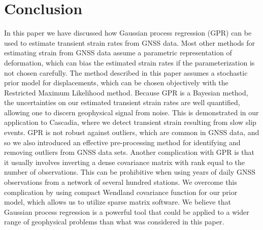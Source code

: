 \documentclass[10pt,letter]{article}
\begin{document}


\section{Conclusion}\label{sec:Conclusion}
In this paper we have discussed how Gaussian process regression (GPR) can be used to estimate transient strain rates from GNSS data. Most other methods for estimating strain from GNSS data assume a parametric representation of deformation, which can bias the estimated strain rates if the parameterization is not chosen carefully. The method described in this paper assumes a stochastic prior model for displacements, which can be chosen objectively with the Restricted Maximum Likelihood method. Because GPR is a Bayesian method, the uncertainties on our estimated transient strain rates are well quantified, allowing one to discern geophysical signal from noise. This is demonstrated in our application to Cascadia, where we detect transient strain resulting from slow slip events. GPR is not robust against outliers, which are common in GNSS data, and so we also introduced an effective pre-processing method for identifying and removing outliers from GNSS data sets. Another complication with GPR is that it usually involves inverting a dense covariance matrix with rank equal to the number of observations. This can be prohibitive when using years of daily GNSS observations from a network of several hundred stations.  We overcome this complication by using compact Wendland covariance function for our prior model, which allows us to utilize sparse matrix software. We believe that Gaussian process regression is a powerful tool that could be applied to a wider range of geophysical problems than what was considered in this paper.   





\end{document}
